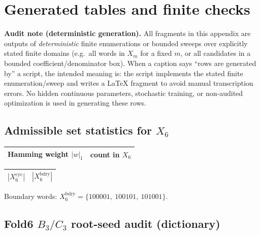 \section{Generated tables and finite checks}
\label{app:generated_tables}

\noindent
\textbf{Audit note (deterministic generation).}
All fragments in this appendix are outputs of \emph{deterministic} finite enumerations or bounded sweeps over explicitly stated finite domains (e.g.\ all words in $X_m$ for a fixed $m$, or all candidates in a bounded coefficient/denominator box).
When a caption says ``rows are generated by'' a script, the intended meaning is:
the script implements the stated finite enumeration/sweep and writes a \LaTeX{} fragment to avoid manual transcription errors.
No hidden continuous parameters, stochastic training, or non-audited optimization is used in generating these rows.

\subsection{Admissible set statistics for \texorpdfstring{$X_6$}{X6}}

\begin{center}
\small
\setlength{\tabcolsep}{10pt}
\renewcommand{\arraystretch}{1.15}
\begin{tabular}{rr}
\toprule
Hamming weight $|w|_1$ & count in $X_6$ \\
\midrule

\end{tabular}
\end{center}

\begin{center}
\small
\setlength{\tabcolsep}{10pt}
\renewcommand{\arraystretch}{1.15}
\begin{tabular}{rr}
\toprule
$|X_6^{\mathrm{cyc}}|$ & $|X_6^{\mathrm{bdry}}|$ \\
\midrule

\end{tabular}
\end{center}

\noindent Boundary words: $X_6^{\mathrm{bdry}}=\{100001,\ 100101,\ 101001\}$.

\subsection{Fold6 $B_3/C_3$ root-seed audit (dictionary)}
\label{subsec:fold6_b3c3_seed_generated}

